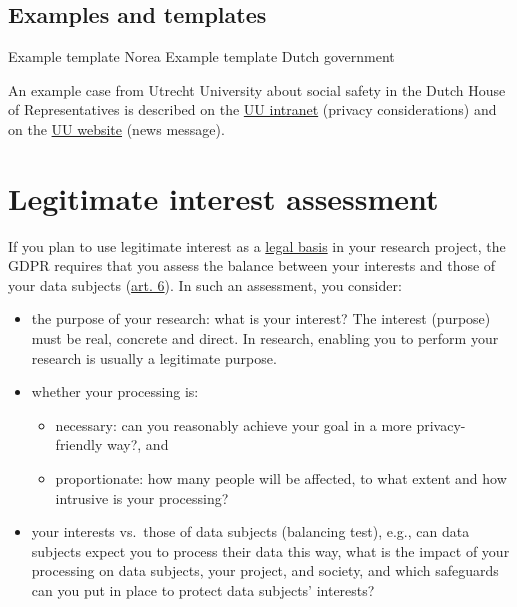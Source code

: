 \documentclass[
]{book}
\providecommand{\tightlist}{%
  \setlength{\itemsep}{0pt}\setlength{\parskip}{0pt}}
\begin{document}
\hypertarget{examples-and-templates-2}{%
\subsection{Examples and templates}\label{examples-and-templates-2}}

Example template Norea
Example template Dutch government

An example case from Utrecht University about social safety in the Dutch House
of Representatives is described on the
\href{https://intranet.uu.nl/en/news/background/privacy-in-practice-research-into-social-safety-in-the-dutch-house-of-representatives}{UU intranet}
(privacy considerations) and on the
\href{https://www.uu.nl/en/news/utrecht-university-to-study-social-safety-in-dutch-house-of-representatives}{UU website}
(news message).

\hypertarget{legitimate-interest-assessment}{%
\section{Legitimate interest assessment}\label{legitimate-interest-assessment}}

If you plan to use legitimate interest as a \protect\hyperlink{legal-basis}{legal basis} in your
research project, the GDPR requires that you assess the balance between your
interests and those of your data subjects
(\href{https://gdpr-info.eu/art-6-gdpr/}{art. 6}). In such an
assessment, you consider:

\begin{itemize}
\tightlist
\item
  the purpose of your research: what is your interest? The interest (purpose)
  must be real, concrete and direct. In research, enabling you to perform your
  research is usually a legitimate purpose.
\item
  whether your processing is:

  \begin{itemize}
  \tightlist
  \item
    necessary: can you reasonably achieve your goal in a more privacy-friendly
    way?, and
  \item
    proportionate: how many people will be affected, to what extent and how
    intrusive is your processing?
  \end{itemize}
\item
  your interests vs.~those of data subjects (balancing test), e.g., can data
  subjects expect you to process their data this way, what is the impact of your
  processing on data subjects, your project, and society, and which safeguards can
  you put in place to protect data subjects' interests?
\end{itemize}
\end{document}
